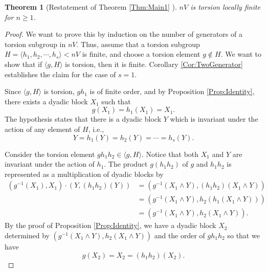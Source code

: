 \documentclass[12pt,reqno]{amsart}
\theoremstyle{plain}
\newtheorem{theorem}{Theorem}[section]
\theoremstyle{definition}
\theoremstyle{remark}
\numberwithin{equation}{section}
\begin{document}
\begin{theorem}[Restatement of Theorem \ref{Thm:Main1} ]\label{Thm:TorsionLocallyFinite}  
 	$nV$  is torsion locally finite for  $n \geq 1$.  
\end{theorem} 
\begin{proof} 
	We want to prove this by induction on the number of 
	generators of a torsion subgroup in  $nV$.  
	Thus, 
	assume that 
	a torsion subgroup  $H= \langle h_1,h_2, \cdots, h_s \rangle < nV$  is finite,    
	and choose a torsion element  $g \not\in H$.  
	We want to show that if  $\langle g, H \rangle$  is torsion, 
	then it is finite.  
	Corollary \ref{Cor:TwoGenerator} establishes the claim for the case of  $s = 1$.  

	Since $\langle g, H \rangle$ is torsion, 
        $gh_1$ is of finite order, 
        and by Proposition \ref{Prop:Identity}, 
        there exists a dyadic block  $X_1$ 
        such that 
        \begin{equation*}
      		g(X_1) = h_1(X_1) = X_1.
        \end{equation*} 
        The hypothesis states   
        that there is a dyadic block  $Y$  which is invariant 
        under the action of any element of  $H$, i.e.,   
        \begin{equation*} 
		Y = h_1(Y) = h_2(Y) = \cdots = h_s(Y).   
	\end{equation*} 
 
 	Consider the torsion element $gh_1h_2 \in \langle g, H \rangle$.  
	Notice that both  $X_1$  and  $Y$  are invariant under the action of  $h_1$.     
	The product  $g(h_1h_2)$  of  $g$  and  $h_1 h_2$    
	is represented as a multiplication of dyadic blocks by 
        \begin{align*} 
	          (g^{-1}(X_1), X_1) \cdot (Y, (h_1h_2)(Y)) 
	                       &  = (g^{-1}(X_1 \wedge Y), (h_1h_2)(X_1 \wedge Y)) \\
	                       &  = (g^{-1}(X_1 \wedge Y), h_2(h_1(X_1 \wedge Y))) \\
	                       & = (g^{-1}(X_1 \wedge Y), h_2(X_1 \wedge Y)).        
        \end{align*}  
        By the proof of Proposition \ref{Prop:Identity}, 
        we have a dyadic block $X_2$  determined by  
        $(g^{-1}(X_1 \wedge Y), h_2(X_1 \wedge Y))$  and the order of  
        $gh_1h_2$  
        so that  we have
        \begin{equation}\label{Eq:g(X_2)=X_2} 
		g(X_2) = X_2 = (h_1h_2)(X_2).   
	\end{equation}  
        

\end{proof}
\end{document}
